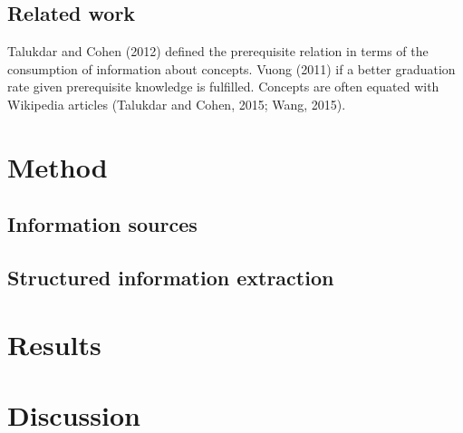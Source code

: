 \documentclass{article}
\begin{document}



\subsection{Related work}
Talukdar and Cohen (2012) defined the prerequisite relation in terms of the consumption of information about concepts. Vuong (2011) if a better graduation rate given prerequisite knowledge is fulfilled. Concepts are often equated with Wikipedia articles (Talukdar and Cohen, 2015; Wang, 2015).

\section{Method}

\subsection{Information sources}

\subsection{Structured information extraction}



\section{Results}



\section{Discussion}





\end{document}
